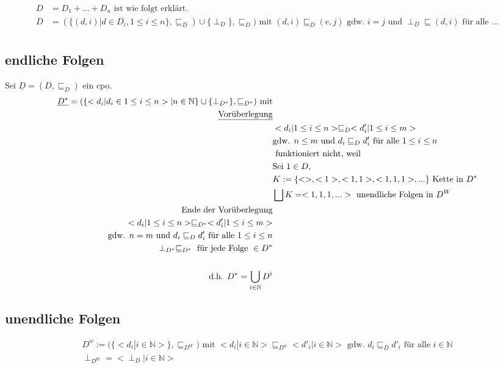 \begin{align*}
D &= D_1 + ... + D_n \text{ ist wie folgt erklärt.}\\
D &= (\{(d,i) | d \in D_i, 1 \leq i \leq n\}, \sqsubseteq_D ) \cup \{\perp_D\}, \sqsubseteq_D) \text{ mit } (d,i) \sqsubseteq_D (e,j) \text{ gdw. } i = j \text{ und } \perp_D \sqsubseteq (d,i) \text{ für alle ...}\\
\end{align*}
\subsection{endliche Folgen}
Sei $\underline{D}=(D,\sqsubseteq_D)$ ein cpo.
\begin{align*}
\underline{D^*} = (\{ <d_i | d_i \in 1 \leq i \leq n > | n \in \mathbb{N} \} \cup \{ \perp_{D^*}\}, \sqsubseteq_{D^*})\text{ mit}&\\
\text{\underline{Vorüberlegung}}& \\
& <d_i | 1 \leq i \leq n> \sqsubseteq_D <d'_i | 1 \leq i \leq m> \\
&\text{gdw. } n \leq m \text{ und } d_i \sqsubseteq_D d'_i \text{ für alle } 1 \leq i \leq n \\
& \text{ funktioniert nicht, weil}\\
&\text{Sei } 1 \in D,\\
& K:= \{ <>,<1>,<1,1>,<1,1,1>,... \} \text{ Kette in } D^* \\
&\bigsqcup K = <1,1,1,...> \text{ unendliche Folgen in } D^W\\
\text{Ende der Vorüberlegung}&\\
<d_i | 1 \leq i \leq n > \sqsubseteq_{D^*} <d'_i | 1 \leq i \leq m > &\\
\text{gdw. } n = m \text{ und } d_i \sqsubseteq_D d'_i \text{ für alle } 1 \leq i \leq n & \\
\perp_{D^*} \sqsubseteq_{D^*} \text{ für jede Folge } \in D^* &\\
\\
\text{d.h. } D^* = \bigcup_{i \in \mathbb{N}} D^i &\\
\end{align*}
\subsection{unendliche Folgen}
\begin{align*}
D^w := (\{ < d_i | i \in \mathbb{N} > \}, \sqsubseteq_{D^W}) \text{ mit } <d_i | i \in \mathbb{N} > \sqsubseteq_{D^w} <d'_i | i \in \mathbb{N}> \text{ gdw. } d_i \sqsubseteq_{D} d'_i \text{ für alle } i \in \mathbb{N}\\
\perp_{D^W} = <\perp_D | i \in \mathbb{N}>\\
\end{align*}
